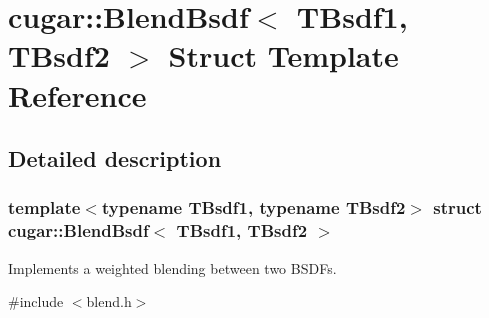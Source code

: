\hypertarget{structcugar_1_1_blend_bsdf}{}\section{cugar\+:\+:Blend\+Bsdf$<$ T\+Bsdf1, T\+Bsdf2 $>$ Struct Template Reference}
\label{structcugar_1_1_blend_bsdf}


\subsection{Detailed description}
\subsubsection*{template$<$typename T\+Bsdf1, typename T\+Bsdf2$>$\newline
struct cugar\+::\+Blend\+Bsdf$<$ T\+Bsdf1, T\+Bsdf2 $>$}

Implements a weighted blending between two B\+S\+D\+Fs. 

{\ttfamily \#include $<$blend.\+h$>$}


